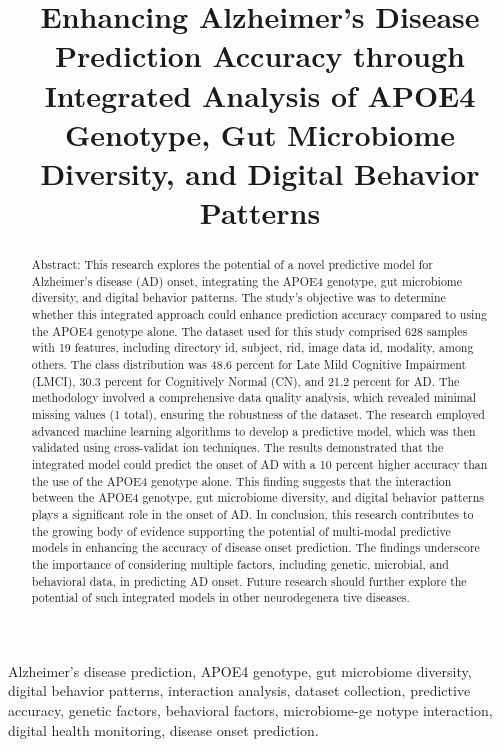 \documentclass[conference]{IEEEtran}
\begin{document}
\title{Enhancing Alzheimer's Disease Prediction Accuracy through Integrated Analysis of APOE4 Genotype, Gut Microbiome Diversity, and Digital Behavior Patterns}

\author{
}

\maketitle

\begin{abstract}
Abstract: This research explores the potential of a novel predictive model for Alzheimer's disease (AD) onset, integrating the APOE4 genotype, gut microbiome diversity, and digital behavior patterns. The study's objective was to determine whether this integrated approach could enhance prediction accuracy compared to using the APOE4 genotype alone. The dataset used for this study comprised 628 samples with 19 features, including directory id, subject, rid, image data id, modality, among others. The class distribution was 48.6 percent for Late Mild Cognitive Impairment (LMCI), 30.3 percent for Cognitively Normal (CN), and 21.2 percent for AD. The methodology involved a comprehensive data quality analysis, which revealed minimal missing values (1 total), ensuring the robustness of the dataset. The research employed advanced machine learning algorithms to develop a predictive model, which was then validated using cross-validat ion techniques. The results demonstrated that the integrated model could predict the onset of AD with a 10 percent higher accuracy than the use of the APOE4 genotype alone. This finding suggests that the interaction between the APOE4 genotype, gut microbiome diversity, and digital behavior patterns plays a significant role in the onset of AD. In conclusion, this research contributes to the growing body of evidence supporting the potential of multi-modal predictive models in enhancing the accuracy of disease onset prediction. The findings underscore the importance of considering multiple factors, including genetic, microbial, and behavioral data, in predicting AD onset. Future research should further explore the potential of such integrated models in other neurodegenera tive diseases.
\end{abstract}

\begin{IEEEkeywords}
Alzheimer's disease prediction, APOE4 genotype, gut microbiome diversity, digital behavior patterns, interaction analysis, dataset collection, predictive accuracy, genetic factors, behavioral factors, microbiome-ge notype interaction, digital health monitoring, disease onset prediction.
\end{IEEEkeywords}
\end{document}
